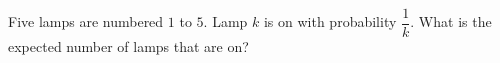 Five lamps are numbered $1$ to $5$. Lamp $k$ is on with probability $\dfrac1k$. What is the expected number of lamps that are on?
